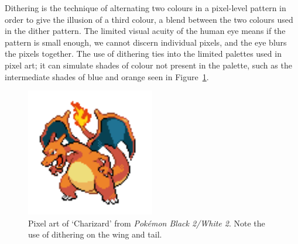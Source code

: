 \documentclass[12pt,twoside,notitlepage]{report}
\begin{document}



Dithering is the technique of alternating two colours in a pixel-level pattern in order to give the illusion of a third colour, a blend between the two colours used in the dither pattern. The limited visual acuity of the human eye means if the pattern is small enough, we cannot discern individual pixels, and the eye blurs the pixels together. The use of dithering ties into the limited palettes used in pixel art; it can simulate shades of colour not present in the palette, such as the intermediate shades of blue and orange seen in Figure~\ref{fig:charizard}.

\begin{figure}[h!]
\centering
\includegraphics[width=0.5\textwidth]{charizard}
\caption{Pixel art of `Charizard' from \textit{Pok\'{e}mon Black 2/White 2}. Note the use of dithering on the wing and tail.}
\label{fig:charizard}
\end{figure}
\end{document}
